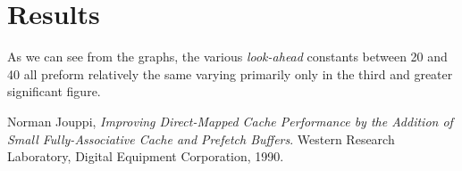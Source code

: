\documentclass[11pt]{article}
\begin{document}
\section{Results}
As we can see from the graphs, the various \textit{look-ahead} constants between 20 and 40 all preform relatively the same varying primarily only in the third and greater significant figure. 

\begin{thebibliography}{9}

  Norman Jouppi,
  \emph{Improving Direct-Mapped Cache Performance by the Addition of Small Fully-Associative Cache and Prefetch Buffers}.
  Western Research Laboratory, Digital Equipment Corporation,
  1990.

\end{thebibliography}
\end{document}

